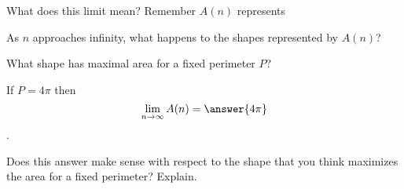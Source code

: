 \documentclass[handout,nooutcomes]{ximera}
\begin{document}
\begin{problem}
What does this limit mean? Remember $A(n)$ represents
\begin{multipleChoice}
\end{multipleChoice}
\begin{freeResponse}
As $n$ approaches infinity, what happens to the shapes represented by $A(n)$?
\end{freeResponse}
\end{problem}

\begin{problem}
What shape has maximal area for a fixed perimeter $P$?
\begin{multipleChoice}
\end{multipleChoice}
\end{problem}

\bigskip

\begin{problem}
If $P = 4\pi$ then \[\lim_{n \to \infty} A(n) = \answer{4\pi}\].\\
\begin{freeResponse}
Does this answer make sense with respect to the shape that you think maximizes the area for a fixed perimeter? Explain.
\end{freeResponse}
\end{problem}
\end{document}
